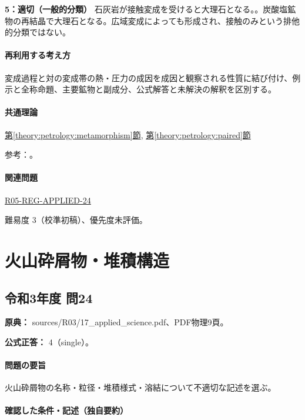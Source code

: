 \noindent\textbf{5：適切（一般的分類）} 石灰岩が接触変成を受けると大理石となる。。炭酸塩鉱物の再結晶で大理石となる。広域変成によっても形成され、接触のみという排他的分類ではない。\par

\paragraph{再利用する考え方} 変成過程と対の変成帯の熱・圧力の成因を成因と観察される性質に結び付け、例示と全称命題、主要鉱物と副成分、公式解答と未解決の解釈を区別する。

\paragraph{共通理論} \hyperref[theory:petrology:metamorphism]{第\ref*{theory:petrology:metamorphism}節}, \hyperref[theory:petrology:paired]{第\ref*{theory:petrology:paired}節}

\par 参考：\cite{aist_awa2021,nelson_contact2011,gsj_metamorphic_words}。

\paragraph{関連問題} \hyperref[q:r05-reg-applied-24]{R05-REG-APPLIED-24}

\par 難易度 3（校準初稿）、優先度未評価。

\section{火山砕屑物・堆積構造}

\subsection{令和3年度 問24}
\label{q:r03-reg-applied-24}

\noindent\textbf{原典：} sources/R03/17\_applied\_science.pdf、PDF物理9頁。

\textbf{公式正答：} 4（single）。

\paragraph{問題の要旨} 火山砕屑物の名称・粒径・堆積様式・溶結について不適切な記述を選ぶ。

\paragraph{確認した条件・記述（独自要約）}\mbox{}\par

